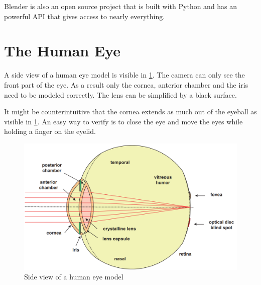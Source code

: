 Blender is also an open source project that is built with Python and has an powerful API that gives access to nearly everything.

\section{The Human Eye}
A side view of a human eye model is visible in \ref{fig:humanEyeModel}. The camera can only see the front part of the eye. As a result only the cornea, anterior chamber and the iris need to be modeled correctly. The lens can be simplified by a black surface. 

It might be counterintuitive that the cornea extends as much out of the eyeball as visible in \ref{fig:humanEyeModel}. An easy way to verify is to close the eye and move the eyes while holding a finger on the eyelid.
\label{sec:theHumanEye}
\begin{figure}[H]
	\centering
	\includegraphics[scale=0.3]{images/human_eye_model.png}
	\caption{Side view of a human eye model}
	\label{fig:humanEyeModel}
\end{figure}

